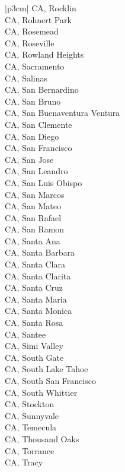 \begin{customLongTable}{ |p{3cm}| }
CA, Rocklin \\ \hline
CA, Rohnert Park \\ \hline
CA, Rosemead \\ \hline
CA, Roseville \\ \hline
CA, Rowland Heights \\ \hline
CA, Sacramento \\ \hline
CA, Salinas \\ \hline
CA, San Bernardino \\ \hline
CA, San Bruno \\ \hline
CA, San Buenaventura Ventura \\ \hline
CA, San Clemente \\ \hline
CA, San Diego \\ \hline
CA, San Francisco \\ \hline
CA, San Jose \\ \hline
CA, San Leandro \\ \hline
CA, San Luis Obispo \\ \hline
CA, San Marcos \\ \hline
CA, San Mateo \\ \hline
CA, San Rafael \\ \hline
CA, San Ramon \\ \hline
CA, Santa Ana \\ \hline
CA, Santa Barbara \\ \hline
CA, Santa Clara \\ \hline
CA, Santa Clarita \\ \hline
CA, Santa Cruz \\ \hline
CA, Santa Maria \\ \hline
CA, Santa Monica \\ \hline
CA, Santa Rosa \\ \hline
CA, Santee \\ \hline
CA, Simi Valley \\ \hline
CA, South Gate \\ \hline
CA, South Lake Tahoe \\ \hline
CA, South San Francisco \\ \hline
CA, South Whittier \\ \hline
CA, Stockton \\ \hline
CA, Sunnyvale \\ \hline
CA, Temecula \\ \hline
CA, Thousand Oaks \\ \hline
CA, Torrance \\ \hline
CA, Tracy \\ \hline

\end{customLongTable}
